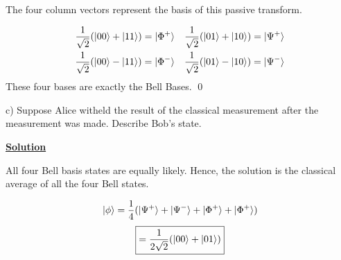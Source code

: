 \documentclass{article}
\newcommand{\new}[1]{
    \vspace{2mm}
    \noindent
    \textbf{
    \underline{#1}}
}
\DeclarePairedDelimiter\ket{\lvert}{\rangle}
\begin{document}
The four column vectors represent the basis of this passive transform. 

\begin{align*}
    \frac 1 {\sqrt 2} (\ket{00}+\ket{11}) = \ket{\Phi^+}
    && \frac 1 {\sqrt 2}(\ket{01} + \ket{10}) = \ket{\Psi^+}
    \\
    \frac 1{\sqrt 2} (\ket{00} - \ket{11}) = \ket{\Phi^-}
    && \frac 1 {\sqrt 2} (\ket {01} - \ket{10}) = \ket{\Psi^-}
\end{align*}
These four bases are exactly the Bell Bases. 
\hfill \qed

c) Suppose Alice witheld the result of the classical measurement 
after the measurement was made. Describe Bob's state. 

\new{Solution}
All four Bell basis states are equally likely. Hence, the solution 
is the classical average of all the four Bell states. 

\[
    \ket \phi = 
    \frac 1 4 (\ket {\Psi^+} + \ket{\Psi ^-} + \ket{\Phi ^+}+\ket {\Phi^+})
\]
\[
    \boxed{
    = \frac 1 {2\sqrt 2} (\ket{00} + \ket {01})    
    }
\]
\end{document}
